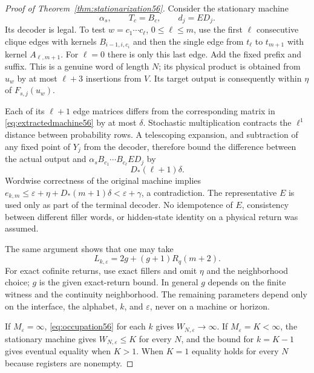 \begin{proof}[Proof of Theorem~\ref{thm:stationarization56}]
Consider the stationary machine
\begin{equation}\label{eq:extractedmachine56}
                  \alpha_s,\qquad T_c=B_c,\qquad d_j=ED_j.
\end{equation}
Its decoder is legal. To test $w=c_1\cdots c_\ell$, $0\le\ell\le m$, use the first $\ell$ consecutive clique edges with kernels $B_{i-1,i,c_i}$ and then the single edge from $t_\ell$ to $t_{m+1}$ with kernel $A_{\ell,m+1}$. For $\ell=0$ there is only this last edge. Add the fixed prefix and suffix. This is a genuine word of length $N$; its physical product is obtained from $u_w$ by at most $\ell+3$ insertions from $V$. Its target output is consequently within $\eta$ of $F_{s,j}(u_w)$.

Each of its $\ell+1$ edge matrices differs from the corresponding matrix in \eqref{eq:extractedmachine56} by at most $\delta$. Stochastic multiplication contracts the $\ell^1$ distance between probability rows. A telescoping expansion, and subtraction of any fixed point of $Y_j$ from the decoder, therefore bound the difference between the actual output and $\alpha_s B_{c_1}\cdots B_{c_\ell}E D_j$ by
\[
                           D_*(\ell+1)\delta.
\]
Wordwise correctness of the original machine implies $e_{k,m}\le\varepsilon+\eta+D_*(m+1)\delta<\varepsilon+\gamma$, a contradiction. The representative $E$ is used only as part of the terminal decoder. No idempotence of $E$, consistency between different filler words, or hidden-state identity on a physical return was assumed.

The same argument shows that one may take
\begin{equation}\label{eq:ramseyloss56}
              L_{k,\varepsilon}=2g+(g+1)R_q(m+2).
\end{equation}
For exact cofinite returns, use exact fillers and omit $\eta$ and the neighborhood choice; $g$ is the given exact-return bound. In general $g$ depends on the finite witness and the continuity neighborhood. The remaining parameters depend only on the interface, the alphabet, $k$, and $\varepsilon$, never on a machine or horizon.

If $M_\varepsilon=\infty$, \eqref{eq:occupation56} for each $k$ gives $W_{N,\varepsilon}\to\infty$. If $M_\varepsilon=K<\infty$, the stationary machine gives $W_{N,\varepsilon}\le K$ for every $N$, and the bound for $k=K-1$ gives eventual equality when $K>1$. When $K=1$ equality holds for every $N$ because registers are nonempty.
\end{proof}

